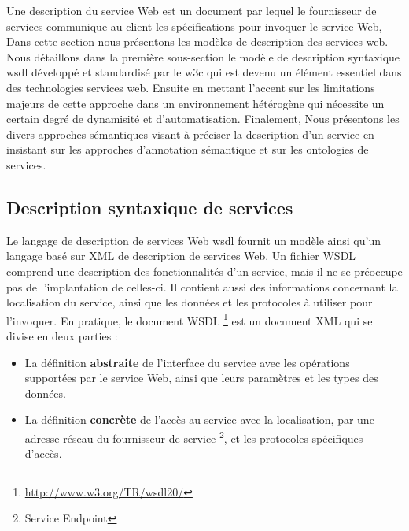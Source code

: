   Une description du service Web est un document par lequel le
  fournisseur de services communique au client les spécifications pour
  invoquer le service Web, Dans cette section nous présentons les
  modèles de description des services web. Nous détaillons dans la
  première sous-section le modèle de description syntaxique
  \acrshort{wsdl} \cite{chinnici2007web} développé et standardisé par le
  \acrshort{w3c} qui est devenu un élément essentiel dans des
  technologies services web. Ensuite en mettant l'accent sur les
  limitations majeurs de cette approche dans un environnement hétérogène
  qui nécessite un certain degré de dynamisité et d'automatisation.
  Finalement, Nous présentons les divers approches sémantiques visant à
  préciser la description d'un service en insistant sur les approches
  d'annotation sémantique et sur les ontologies de services.

    \subsection{Description syntaxique de services}
    Le langage de description de services Web \acrshort{wsdl}
    \cite{chinnici2007web} fournit un modèle ainsi qu'un langage basé sur
    \textsc{XML} de description de services Web. Un fichier \textsc{WSDL}
    comprend une description des fonctionnalités d'un service, mais il ne
    se préoccupe pas de l'implantation de celles-ci.  Il contient aussi
    des informations concernant la localisation du service, ainsi que les
    données et les protocoles à utiliser pour l'invoquer. En pratique, le
    document \textsc{WSDL} \footnote{\url{http://www.w3.org/TR/wsdl20/}}
    est un document \textsc{XML} qui se divise en deux parties
    \cite{elie2010} :

    \SpecialItem
    \begin{itemize} %
    \item La définition \textbf{abstraite} de l'interface du service avec
      les opérations supportées par le service Web, ainsi que leurs
      paramètres et les types des données.
      
    \item La définition \textbf{concrète} de l'accès au service avec la
      localisation, par une adresse réseau du fournisseur de service
      \footnote{Service Endpoint}, et les protocoles spécifiques d'accès.
    \end{itemize}

